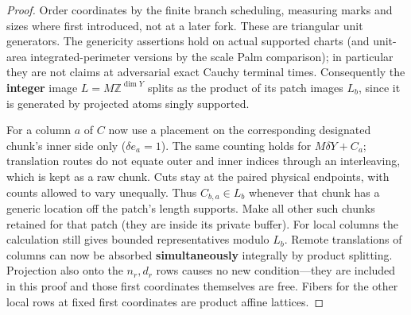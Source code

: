 \begin{proof}
Order coordinates by the finite branch scheduling, measuring marks and sizes where first introduced, not at
a later fork. These are triangular unit generators. The genericity assertions hold on actual supported
charts (and unit-area integrated-perimeter versions by the scale Palm comparison); in particular they are
not claims at adversarial exact Cauchy terminal times. Consequently the \textbf{integer} image \(L=M\mathbb
Z^{\dim Y}\) splits as the product of its patch images \(L_b\), since it is generated by projected atoms
singly supported.

For a column \(a\) of \(C\) now use a placement on the corresponding designated chunk's
inner side only (\(\delta e_a=1\)). The same counting holds for \(M\delta Y+C_a\); translation routes do not
equate outer and inner indices through an interleaving, which is kept as a raw chunk. Cuts stay at the
paired physical endpoints, with counts allowed to vary unequally. Thus \(C_{b,a}\in L_b\) whenever that
chunk has a generic location off the patch's length supports. Make all other such chunks retained for that
patch (they are inside its private buffer). For local columns the calculation still gives bounded
representatives modulo \(L_b\). Remote translations of columns can now be absorbed \textbf{simultaneously}
integrally by product splitting. Projection also onto the \(n_r,d_r\) rows causes no new condition—they are
included in this proof and those first coordinates themselves are free. Fibers for the other local rows at
fixed first coordinates are product affine lattices.\qedhere

\end{proof}

